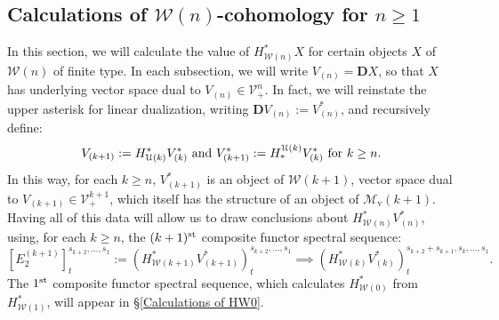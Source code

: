\documentclass[11pt]{amsart} \renewcommand{\baselinestretch}{1.4}
\theoremstyle{plain}
\theoremstyle{definition}
\newcommand{\calU}{\mathcal{U}}
\newcommand{\calV}{\mathcal{V}}
\newcommand{\calw}{\mathcal{W}}
\newcommand{\calMv}{\mathcal{M}\dver}
\newcommand{\vect}[2]{\calV^{#1}_{#2}}
\newcommand{\E}[5]{[E^{#1}_{#2}#3]^{#4}_{#5}}
\newcommand{\dver}{_\mathrm{v}}
\newcommand{\dual}{\mathbf{D}}
\begin{document}
\begin{Calculations of HWn for n nonzero}
\section{\textbf{Calculations of ${\calw(n)}$-cohomology for $n\geq 1$}}
\label{Calculations of HWn for n nonzero}
In this section, we will calculate the value of $H^*_{\calw(n)}X$ for certain  objects $X$ of $\calw(n)$ of finite type. In each subsection, we will write $V_{(n)}=\dual X$, so that $X$ has underlying vector space dual to $V_{{(n)}}\in\vect{n}{+}$. In fact, we will reinstate the upper asterisk for linear dualization, writing $\dual V_{(n)}:=V^*_{(n)}$, and recursively define:
\[V_{(k+1)}:=H^*_{\calU(k)}V^*_{(k)}\textup{ and }V^*_{(k+1)}:=H_*^{\calU(k)}V^*_{(k)}\textup{ for $k\geq n$}.\]
In this way, for each $k\geq n$, $V^*_{(k+1)}$ is an object of $\calw(k+1)$, vector space dual to $V_{(k+1)}\in\vect{k+1}{+}$, which itself has the structure of an object of $\calMv(k+1)$.
Having all of this data will allow us to draw conclusions about $H^*_{\calw(n)}V^*_{(n)}$, using, for each $k\geq n$, the $(k+1)^{\textup{st}}$ composite functor spectral sequence:
\[\E{(k+1)}{2}{}{s_{k+2},\ldots,s_1}{t}:=(H^*_{\calw(k+1)}V^*_{(k+1)})^{s_{k+2},\ldots,s_1}_{t}\implies (H^*_{\calw(k)}V^*_{(k)})^{s_{k+2}+s_{k+1},s_k,\ldots,s_1}_{t}.\]
The $1^{\textup{st}}$ composite functor spectral sequence, which calculates $H^*_{\calw(0)}$ from $H^*_{\calw(1)}$, will appear in \S\ref{Calculations of HW0}.




\end{Calculations of HWn for n nonzero}
\end{document}
